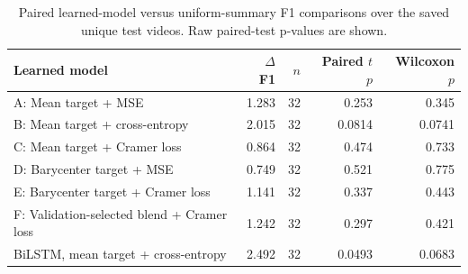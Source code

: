 \begin{table}[ht]
\centering
\caption{Paired learned-model versus uniform-summary F1 comparisons over the saved unique test videos. Raw paired-test p-values are shown.}
\label{tab:learned-uniform}
\begin{tabular}{lrrrr}
\toprule
Learned model & $\Delta$ F1 & $n$ & Paired $t$ $p$ & Wilcoxon $p$ \\
\midrule
A: Mean target + MSE & 1.283 & 32 & 0.253 & 0.345 \\
B: Mean target + cross-entropy & 2.015 & 32 & 0.0814 & 0.0741 \\
C: Mean target + Cramer loss & 0.864 & 32 & 0.474 & 0.733 \\
D: Barycenter target + MSE & 0.749 & 32 & 0.521 & 0.775 \\
E: Barycenter target + Cramer loss & 1.141 & 32 & 0.337 & 0.443 \\
F: Validation-selected blend + Cramer loss & 1.242 & 32 & 0.297 & 0.421 \\
BiLSTM, mean target + cross-entropy & 2.492 & 32 & 0.0493 & 0.0683 \\
\bottomrule
\end{tabular}
\end{table}
